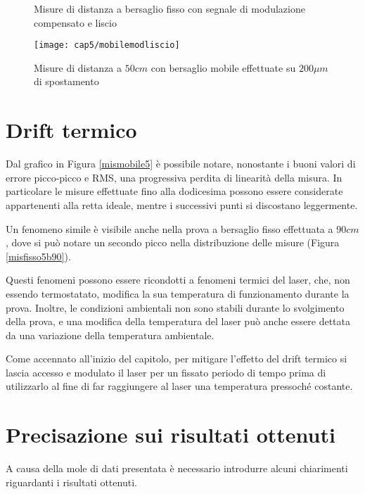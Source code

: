 \begin{figure}[H]
	\centering
	\end{figure}
\begin{figure}[H]
	\centering
	\caption{Misure di distanza a bersaglio fisso con segnale di modulazione compensato e liscio}\label{fissomodliscio}
\end{figure}
\begin{figure}[H]
	\centering
		\texttt{[image: cap5/mobilemodliscio]}
		\caption{Misure di distanza a $50cm$ con bersaglio mobile effettuate su $200 \mu m$ di spostamento}
		\label{mobilemodliscio}
\end{figure}

\section{Drift termico}
Dal grafico in Figura \ref{mismobile5} è possibile notare, nonostante i buoni valori di errore picco-picco e RMS, una progressiva perdita di linearità della misura. In particolare le misure effettuate fino alla dodicesima possono essere considerate appartenenti alla retta ideale, mentre i successivi punti si discostano leggermente.

Un fenomeno simile è visibile anche nella prova a bersaglio fisso effettuata a $90cm$, dove si può notare un secondo picco nella distribuzione delle misure (Figura \ref{misfisso5b90}).

Questi fenomeni possono essere ricondotti a fenomeni termici del laser, che, non essendo termostatato, modifica la sua temperatura di funzionamento durante la prova. Inoltre, le condizioni ambientali non sono stabili durante lo svolgimento della prova, e una modifica della temperatura del laser può anche essere dettata da una variazione della temperatura ambientale.

Come accennato all'inizio del capitolo, per mitigare l'effetto del drift termico si lascia accesso e modulato il laser per un fissato periodo di tempo prima di utilizzarlo al fine di far raggiungere al laser una temperatura pressoché costante.



\section{Precisazione sui risultati ottenuti}
A causa della mole di dati presentata è necessario introdurre alcuni chiarimenti riguardanti i risultati ottenuti.

